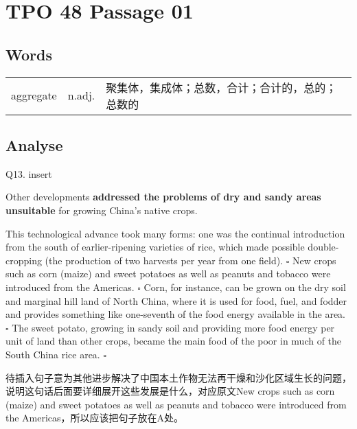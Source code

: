 \section{TPO 48 Passage 01}

\subsection{Words}

\begin{tabular}{lll}
    aggregate & n.adj. & 聚集体，集成体；总数，合计；合计的，总的；总数的 \\
\end{tabular}

\subsection{Analyse}

\begin{blk}
    \begin{qst}
        Q13. insert

        Other developments \textbf{addressed the problems of dry and sandy areas unsuitable} for growing China’s native crops.
    \end{qst}

    \begin{psgq}
        This technological advance took many forms: one was the continual introduction from the south of earlier-ripening varieties of rice, which made possible double-cropping (the production of two harvests per year from one field). $\square$ New crops such as corn (maize) and sweet potatoes as well as peanuts and tobacco were introduced from the Americas. $\square$ Corn, for instance, can be grown on the dry soil and marginal hill land of North China, where it is used for food, fuel, and fodder and provides something like one-seventh of the food energy available in the area. $\square$ The sweet potato, growing in sandy soil and providing more food energy per unit of land than other crops, became the main food of the poor in much of the South China rice area. $\square$
    \end{psgq}

    \begin{nlz}
        待插入句子意为其他进步解决了中国本土作物无法再干燥和沙化区域生长的问题，说明这句话后面要详细展开这些发展是什么，对应原文New crops such as corn (maize) and sweet potatoes as well as peanuts and tobacco were introduced from the Americas，所以应该把句子放在A处。
    \end{nlz}
\end{blk}
